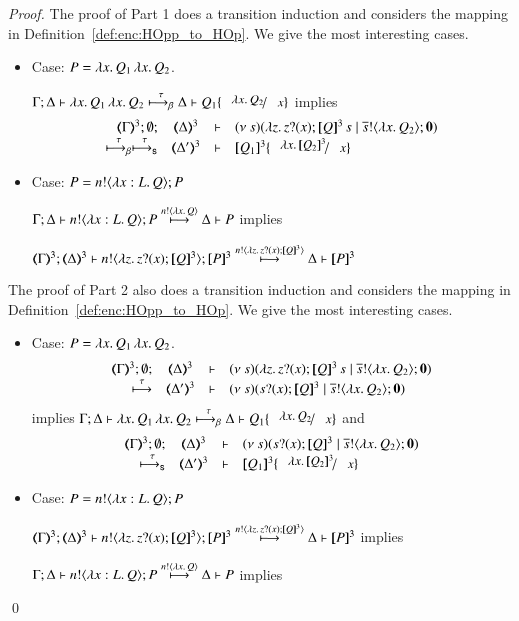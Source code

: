 \begin{proof}
	The proof of Part 1 does a transition induction and
	considers the mapping in Definition~\ref{def:enc:HOpp_to_HOp}.
	We give the most interesting cases.

	\begin{itemize}
		\item	Case: $P = \lambda x.\,Q_1\,\lambda x.\,Q_2$.

			$\horel{\Gamma}{\Delta}{\appl{\abs{x}{Q_1}}{\abs{x}{Q_2}}}{\bhby{\tau}}{\Delta}{Q_1 \subst{\abs{x}{Q_2}}{x}}$ implies
\[
			\mhorel{\tmap{\Gamma}{3}}{\tmap{\Delta}{3}}{ \newsp{s}{ \appl{\abs{z}\binp{z}{x} \pmap{Q}{3}}{s}  \Par \bout{\dual{s}}{\abs{x}{Q_2}} \inact}}{\bhby{\tau} \shby{\tau}}
			{\tmap{\Delta'}{3}}{}{\pmap{Q_1}{3} \subst{\abs{x}{\pmap{Q_2}{3}}}{x}}
\]

		\item	Case: $P = n ! \langle \lambda x:L.\,Q \rangle ; P$

			$\Gamma; \Delta \vdash n ! \langle \lambda x:L.\,Q \rangle ; P \stackrel{ n ! \langle \lambda x.\,Q \rangle}{\longmapsto} \Delta \vdash P$ implies

			$\horel{\tmap{\Gamma}{3}}{\tmap{\Delta}{3}}{\bout{n}{\abs{z} \binp{z}{x} \pmap{Q}{3}} \pmap{P}{3}}{\hby{ \bactout{n}{\abs{z}{\binp{z}{x} \pmap{Q}{3}} } }}{\Delta}{\pmap{P}{3}}$
	\end{itemize}

	The proof of Part 2 also does a transition induction and
	considers the mapping in Definition~\ref{def:enc:HOpp_to_HOp}.
	We give the most interesting cases.

	\begin{itemize}
		\item	Case: $P = \lambda x.\,Q_1\,\lambda x.\,Q_2$.
%
		\[
			\mhorel{\tmap{\Gamma}{3}}{\tmap{\Delta}{3}}{\newsp{s}{ \appl{\abs{z}\binp{z}{x} \pmap{Q}{3}}{s}  \Par \bout{\dual{s}}{\abs{x}{Q_2}} \inact}}{\hby{\tau}}
			{\tmap{\Delta'}{3}}{}{\newsp{s}{\binp{s}{x} \pmap{Q}{3}  \Par \bout{\dual{s}}{\abs{x}{Q_2}} \inact}}
		\]
%
			\noi implies
			$\horel{\Gamma}{\Delta}{\appl{\abs{x}{Q_1}}{\abs{x}{Q_2}}}{\bhby{\tau}}{\Delta}{Q_1 \subst{\abs{x}{Q_2}}{x}}$ and
%
		\[
			\mhorel{\tmap{\Gamma}{3}}{\tmap{\Delta}{3}}{\newsp{s}{\binp{s}{x} \pmap{Q}{3}  \Par \bout{\dual{s}}{\abs{x}{Q_2}} \inact}}{\shby{\tau}}
			{\tmap{\Delta'}{3}}{}{\pmap{Q_1}{3} \subst{\abs{x}{\pmap{Q_2}{3}}}{x}}
		\]

		\item	Case: $P = n ! \langle \lambda x:L.\,Q \rangle ; P$

			$\horel{\tmap{\Gamma}{3}}{\tmap{\Delta}{3}}{\bout{n}{\abs{z} \binp{z}{x} \pmap{Q}{3}} \pmap{P}{3}}{\hby{ \bactout{n}{\abs{z}{\binp{z}{x} \pmap{Q}{3}} } }}{\Delta}{\pmap{P}{3}}$ implies

			$\Gamma; \Delta \vdash n ! \langle \lambda x:L.\,Q \rangle ; P \stackrel{ n ! \langle \lambda x.\,Q \rangle}{\longmapsto} \Delta \vdash P$ implies
	\end{itemize}
	\qed
\end{proof}

